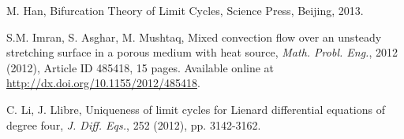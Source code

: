 \documentclass{uestcMath}
\begin{document}

\begin{thebibliography}{99}
M. Han, Bifurcation Theory of Limit Cycles, Science Press, Beijing, 2013.


S.M. Imran, S. Asghar, M. Mushtaq, Mixed convection flow over an unsteady
stretching surface in a porous medium with heat source, {\em Math. Probl. Eng.},
2012 (2012), Article ID 485418, 15 pages. Available online at \url{http://dx.doi.org/10.1155/2012/485418}.


C. Li, J. Llibre, Uniqueness of limit cycles for Lienard differential
equations of degree four, {\em J. Diff. Eqs.}, 252 (2012), pp. 3142-3162.
\end{thebibliography}
\end{document}
